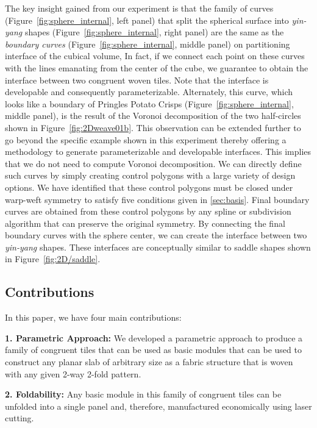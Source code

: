 \documentclass[times,twocolumn,final]{elsarticle}
\begin{document}
The key insight gained from our experiment is that the family of curves (Figure~\ref{fig:sphere_internal}, left panel) that split the spherical surface into \textit{yin-yang} shapes (Figure~\ref{fig:sphere_internal}, right panel) are the same as the \textit{boundary curves} (Figure~\ref{fig:sphere_internal}, middle panel) on partitioning interface of the cubical volume, In fact, if we connect each point on these curves with the lines emanating from the center of the cube, we guarantee to obtain the interface between two congruent woven tiles. Note that the interface is developable and consequently parameterizable. Alternately, this curve, which looks like a boundary of Pringles Potato Crisps (Figure~\ref{fig:sphere_internal}, middle panel), is the result of the Voronoi decomposition of the two half-circles shown in Figure~\ref{fig:2Dweave01b}. This observation can be extended further to go beyond the specific example shown in this experiment thereby offering a methodology to generate parameterizable and developable interfaces. 
This implies that we do not need to compute Voronoi decomposition. We can directly define such curves by simply creating control polygons with a large variety of design options. We have identified that these control polygons must be closed under warp-weft symmetry to satisfy five conditions given in \ref{sec:basis}. Final boundary curves are obtained from these control polygons by any spline or subdivision algorithm that can preserve the original symmetry. By connecting the final boundary curves with the sphere center, we can create the interface between two \textit{yin-yang} shapes. These interfaces are conceptually similar to saddle shapes shown in Figure~\ref{fig:2D/saddle}.

\subsection{Contributions}

In this paper, we have four main contributions: 

\noindent \textbf{1. Parametric Approach:} We developed a parametric approach to produce a family of congruent tiles that can be used as basic modules that can be used to construct any planar slab of arbitrary size as a fabric structure that is woven with any given 2-way 2-fold pattern. 

\noindent \textbf{2. Foldability:} Any basic module in this family of congruent tiles can be unfolded into a single panel and, therefore, manufactured economically using laser cutting.  
\end{document}

